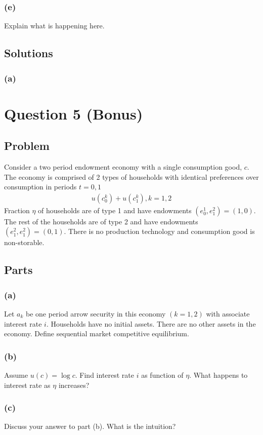 \documentclass[10pt, a4paper]{article}
\begin{document}
    \subsubsection*{(e)}
      Explain what is happening here.
  \subsection*{Solutions}
    \subsubsection*{(a)}
      
\section*{Question 5 (Bonus)}
  \subsection*{Problem}
    Consider a two period endowment economy with a single consumption good, $c$. The economy is comprised of 2 types of households with identical preferences over consumption in periods $t = 0,1$
    \begin{gather*}
      u(c^k_0) + u(c^k_1), k = 1,2
    \end{gather*}
    Fraction $\eta$ of households are of type 1 and have endowments $(e^1_0, e^2_1) = (1,0)$. The rest of the households are of type 2 and have endowments $(e^2_1, e^2_1) = (0,1)$. There is no production technology and consumption good is non-storable.
  \subsection*{Parts}
    \subsubsection*{(a)}
      Let $a_k$ be one period arrow security in this economy $(k = 1,2)$ with associate interest rate $i$. Households have no initial assets. There are no other assets in the economy. Define sequential market competitive equilibrium.
    \subsubsection*{(b)}
      Assume $u(c) = \log c$. Find interest rate $i$ as function of $\eta$. What happens to interest rate as $\eta$ increases?
    \subsubsection*{(c)}
      Discuss your answer to part (b). What is the intuition?
\end{document}
